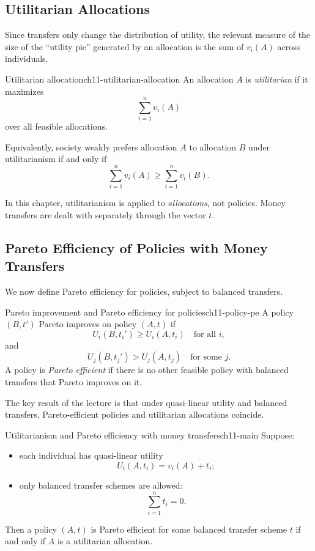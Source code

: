 \subsection{Utilitarian Allocations}

Since transfers only change the distribution of utility, the relevant measure of the size of the ``utility pie'' generated by an allocation is the sum of $v_i(A)$ across individuals.

\begin{definition}{Utilitarian allocation}{ch11-utilitarian-allocation}
An allocation $A$ is \emph{utilitarian} if it maximizes
\[
\sum_{i=1}^n v_i(A)
\]
over all feasible allocations.
\end{definition}

Equivalently, society weakly prefers allocation $A$ to allocation $B$ under utilitarianism if and only if
\[
\sum_{i=1}^n v_i(A)\ge \sum_{i=1}^n v_i(B).
\]

\begin{examtip}
In this chapter, utilitarianism is applied to \emph{allocations}, not policies. Money transfers are dealt with separately through the vector $t$.
\end{examtip}

\subsection{Pareto Efficiency of Policies with Money Transfers}

We now define Pareto efficiency for policies, subject to balanced transfers.

\begin{definition}{Pareto improvement and Pareto efficiency for policies}{ch11-policy-pe}
A policy $(B,t')$ Pareto improves on policy $(A,t)$ if
\[
U_i(B,t_i') \ge U_i(A,t_i)
\quad \text{for all } i,
\]
and
\[
U_j(B,t_j') > U_j(A,t_j)
\quad \text{for some } j.
\]
A policy is \emph{Pareto efficient} if there is no other feasible policy with balanced transfers that Pareto improves on it.
\end{definition}

The key result of the lecture is that under quasi-linear utility and balanced transfers, Pareto-efficient policies and utilitarian allocations coincide.

\begin{theorem}{Utilitarianism and Pareto efficiency with money transfers}{ch11-main}
Suppose:
\begin{itemize}
    \item each individual has quasi-linear utility
    \[
    U_i(A,t_i)=v_i(A)+t_i;
    \]
    \item only balanced transfer schemes are allowed:
    \[
    \sum_{i=1}^n t_i=0.
    \]
\end{itemize}
Then a policy $(A,t)$ is Pareto efficient for some balanced transfer scheme $t$ if and only if $A$ is a utilitarian allocation.
\end{theorem}

